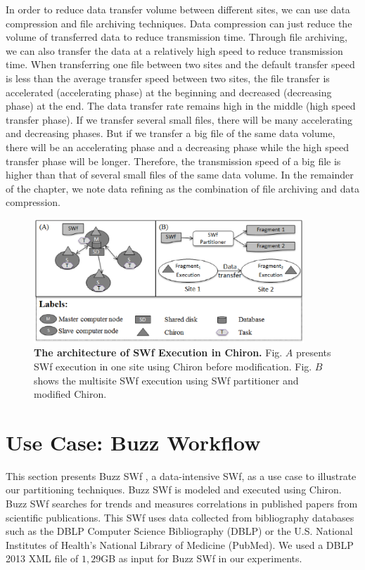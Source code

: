In order to reduce data transfer volume between different sites, we can use data compression and file archiving techniques. Data compression can just reduce the volume of transferred data to reduce transmission time. Through file archiving, we can also transfer the data at a relatively high speed to reduce transmission time. When transferring one file between two sites and the default transfer speed is less than the average transfer speed between two sites, the file transfer is accelerated (accelerating phase) at the beginning and decreased (decreasing phase) at the end. The data transfer rate remains high in the middle (high speed transfer phase).
If we transfer several small files, there will be many accelerating and decreasing phases.
But if we transfer a big file of the same data volume, there will be an accelerating phase and a decreasing phase while the high speed transfer phase will be longer. Therefore, the transmission speed of a big file is higher than that of several small files of the same data volume. In the remainder of the chapter, we note data refining as the combination of file archiving and data compression.


\begin{figure}
\begin{centering}
\includegraphics[width=4in]{figures/SF4_fragment.eps}
\par\end{centering}
\caption{\textbf{The architecture of SWf Execution in Chiron. } Fig. $A$ presents SWf execution in one site using Chiron before modification. Fig. $B$ shows the multisite SWf execution using SWf partitioner and modified Chiron.}
\label{fig:f2} 
\end{figure}

\section{Use Case: Buzz Workflow}
\label{sec:UCBuzz}
This section presents Buzz SWf \cite{Dias2013}, a data-intensive SWf, as a use case to illustrate our partitioning techniques. Buzz SWf is modeled and executed using Chiron. Buzz SWf searches for trends and measures correlations in published papers from scientific publications. This SWf uses data collected from bibliography databases such as the DBLP Computer Science Bibliography (DBLP) \cite{dblp} or the U.S. National Institutes of Health's National Library of Medicine (PubMed). 
We used a DBLP 2013 XML file of $1,29$GB as input for Buzz SWf in our experiments.

